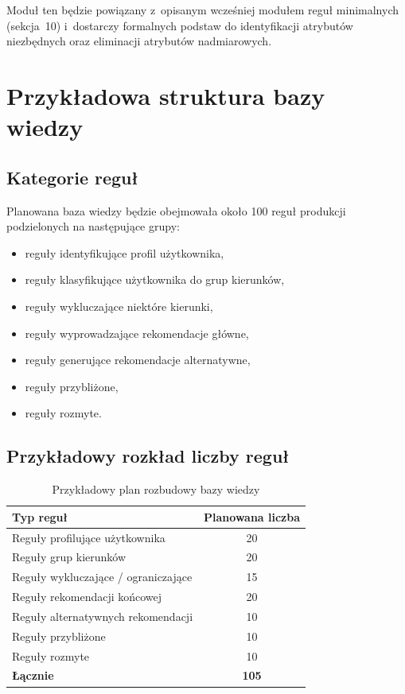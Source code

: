\documentclass[12pt,a4paper,oneside]{article}
\begin{document}
Moduł ten będzie powiązany z~opisanym wcześniej modułem reguł minimalnych (sekcja~10) i~dostarczy formalnych podstaw do identyfikacji atrybutów niezbędnych oraz eliminacji atrybutów nadmiarowych.

\newpage

\section{Przykładowa struktura bazy wiedzy}

\subsection{Kategorie reguł}

Planowana baza wiedzy będzie obejmowała około 100 reguł produkcji podzielonych na następujące grupy:
\begin{itemize}[leftmargin=1.2cm]
    \item reguły identyfikujące profil użytkownika,
    \item reguły klasyfikujące użytkownika do grup kierunków,
    \item reguły wykluczające niektóre kierunki,
    \item reguły wyprowadzające rekomendacje główne,
    \item reguły generujące rekomendacje alternatywne,
    \item reguły przybliżone,
    \item reguły rozmyte.
\end{itemize}

\subsection{Przykładowy rozkład liczby reguł}

\begin{table}[H]
\centering
\begin{tabular}{p{8cm}c}
\toprule
\textbf{Typ reguł} & \textbf{Planowana liczba} \\
\midrule
Reguły profilujące użytkownika & 20 \\
Reguły grup kierunków & 20 \\
Reguły wykluczające / ograniczające & 15 \\
Reguły rekomendacji końcowej & 20 \\
Reguły alternatywnych rekomendacji & 10 \\
Reguły przybliżone & 10 \\
Reguły rozmyte & 10 \\
\midrule
\textbf{Łącznie} & \textbf{105} \\
\bottomrule
\end{tabular}
\caption{Przykładowy plan rozbudowy bazy wiedzy}
\end{table}
\end{document}
